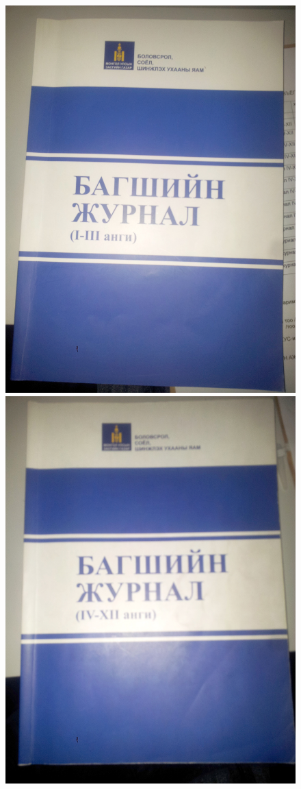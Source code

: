 \begin{figure}[htbp]
	\includegraphics[scale=0.05]{figures/20171006_162113.jpg}
	\centering
	\includegraphics[scale=0.05]{figures/20171006_162422.jpg}

\end{figure}
